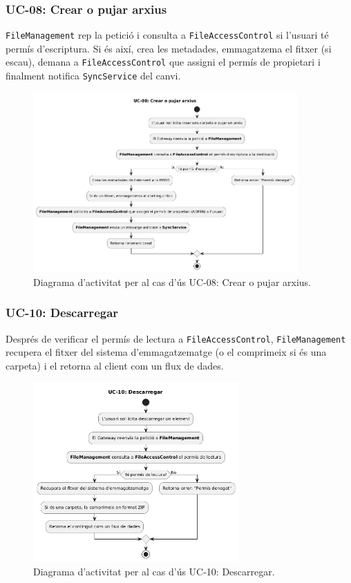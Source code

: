 \subsubsection{UC-08: Crear o pujar arxius}
\texttt{FileManagement} rep la petició i consulta a \texttt{FileAccessControl} si l'usuari té permís d'escriptura. Si és així, crea les metadades, emmagatzema el fitxer (si escau), demana a \texttt{FileAccessControl} que assigni el permís de propietari i finalment notifica \texttt{SyncService} del canvi.

\begin{figure}[H]
    \centering
    \includegraphics[width=0.9\textwidth]{Figures/ad_UC08.png}
    \caption{Diagrama d'activitat per al cas d'ús UC-08: Crear o pujar arxius.}
    \label{fig:ad_uc08}
\end{figure}

\subsubsection{UC-10: Descarregar}
Després de verificar el permís de lectura a \texttt{FileAccessControl}, \texttt{FileManagement} recupera el fitxer del sistema d'emmagatzematge (o el comprimeix si és una carpeta) i el retorna al client com un flux de dades.

\begin{figure}[H]
    \centering
    \includegraphics[width=0.7\textwidth]{Figures/ad_UC10.png}
    \caption{Diagrama d'activitat per al cas d'ús UC-10: Descarregar.}
    \label{fig:ad_uc10}
\end{figure}

